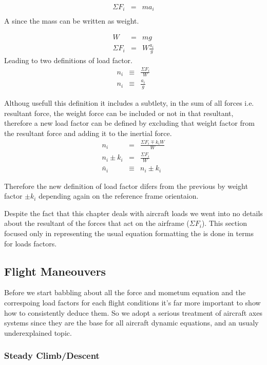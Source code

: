\begin{eqnarray}
\Sigma F_i &=& m a_i \\
\end{eqnarray}
A since the mass can be written as weight.



\begin{eqnarray}
W &=& m g \\
\Sigma F_i &=& W \frac{a_i}{g}
\end{eqnarray}
Leading to two definitions of load factor.
\begin{eqnarray}
n_i &\equiv& \frac{\Sigma F_i}{W} \\
n_i &\equiv& \frac{a_i}{g}
\end{eqnarray}

Althoug usefull this definition it includes a subtlety, in the sum of all forces i.e. resultant force, the weight force can be included
or not in that resultant, therefore a new load factor can be defined by excluding that weight factor from the resultant force and adding it to the inertial force.
\begin{eqnarray}
n_i &=& \frac{\Sigma F_i \mp k_iW}{W} \\
n_i \pm k_i &=& \frac{\Sigma F_i}{W} \\
\bar{n}_i &\equiv& n_i \pm k_i
\end{eqnarray}

Therefore the new definition of load factor difers from the previous by weight factor $\pm k_i$ depending again on the reference frame orientaion.

Despite the fact that this chapter deals with aircraft loads we went into no details about the resultant of the forces that act on the
airframe ($\Sigma F_i$). This section focused only in representing the usual equation formatting the is done in terms for loads factors.



\subsection{Flight Maneouvers}
Before we start babbling about all the force and mometum equation and the
correspoing load factors for each flight conditions it's far more important
to show how to consistently deduce them. So we adopt a serious treatment of aircraft axes systems since they are the base for
all aircraft dynamic equations, and an usualy underexplained topic.

\subsubsection{Steady Climb/Descent}

